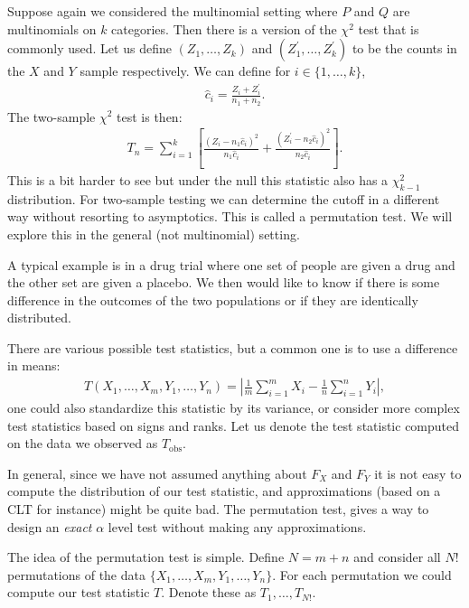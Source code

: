 \documentclass[twoside,12pt]{article}
\begin{document}
Suppose again we considered the multinomial setting where $P$ and $Q$ are multinomials on $k$ categories. Then there is a version of the $\chi^2$ test that is commonly used. Let us define $(Z_1,\ldots,Z_k)$ and $(Z_1^{\prime}, \ldots, Z_k^{\prime})$ to be the counts in the $X$ and $Y$ sample respectively. We can define for $i \in \{1,\ldots,k\}$,
\begin{align*}
\widehat{c}_i = \frac{Z_i + Z_i^{\prime}}{n_1 + n_2}.
\end{align*}
The two-sample $\chi^2$ test is then:
\begin{align*}
T_n = \sum_{i=1}^k \left[ \frac{ (Z_i - n_1 \widehat{c}_i)^2}{n_1 \widehat{c}_i} +  \frac{ (Z_i^{\prime} - n_2 \widehat{c}_i)^2}{n_2 \widehat{c}_i} \right].
\end{align*}
This is a bit harder to see but under the null this statistic also has a $\chi^2_{k-1}$ distribution.
For two-sample testing we can determine the cutoff in a different way without resorting to asymptotics. 
This is called a permutation test. We will explore this in the general (not multinomial) setting.

A typical example is in a drug trial where one set of people are given a drug and the other set are 
given a placebo. We then would like to know if there is some difference in the outcomes of the two
populations or if they are identically distributed.

There are various possible test statistics, but a common one is to use a difference in means:
\begin{align*}
T(X_1,\ldots,X_m, Y_1,\ldots,Y_n) = \left| \frac{1}{m} \sum_{i=1}^m X_i - \frac{1}{n} \sum_{i=1}^n Y_i\right|,
\end{align*}
one could also standardize this statistic by its variance, or consider more complex test statistics based on signs and ranks. Let us denote the test statistic computed on the data we observed as $T_{\mathrm{obs}}.$

In general, since we have not assumed anything about $F_X$ and $F_Y$ it is not easy to compute the distribution of our test statistic, and approximations (based on a CLT for instance) might be quite bad.
The permutation test, gives a way to design an \emph{exact} $\alpha$ level test without making any approximations.

The idea of the permutation test is simple. Define $N = m+n$ and consider all $N!$ permutations
of the data $\{X_1,\ldots,X_m, Y_1,\ldots,Y_n\}$. For each permutation we could compute our test statistic $T$. Denote these as $T_1,\ldots,T_{N!}$.
\end{document}
